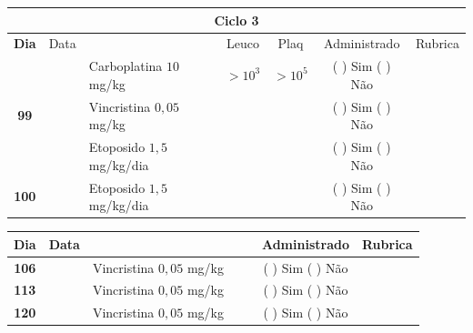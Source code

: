 \documentclass[11pt,a4paper,oldfontcommands]{memoir}
\begin{document}
\begin{center}
\begin{longtable}{p{1cm}c|p{5cm}|p{1.5cm}p{1.5cm}|c|c}
	\hline
	\multicolumn{7}{c}{Ciclo 3} \\
	\hline
	\multicolumn{1}{c|}{\multirow{1}{*}{\textbf{Dia}}}&{Data}&{}&\multicolumn{1}{c|}{Leuco}&\multicolumn{1}{c|}{Plaq}&{Administrado}&{Rubrica} \\
    \hline
    \multicolumn{1}{c|}{\multirow{3}{*}{\textbf{99}}}&\multirow{2}{*}{}&{Carboplatina \(10\) mg/kg}&\multicolumn{1}{c|}{\(>10^3\)}&\multicolumn{1}{c|}{\(>10^5\)}&{(  ) Sim (  ) Não}&\\
    \cline{4-5}
    \multicolumn{1}{c|}{}&&{Vincristina \(0,05\) mg/kg}&\multicolumn{1}{c|}{}&&{(  ) Sim (  ) Não}&\\
    \cline{4-5}
    \multicolumn{1}{c|}{}&\multirow{1}{*}{}&{Etoposido \(1,5\) mg/kg/dia}&{}&&{(  ) Sim (  ) Não}&\\
    \cline{1-3}\cline{6-6}
    \multicolumn{1}{c|}{\textbf{100}}&\multirow{1}{*}{}&{Etoposido \(1,5\) mg/kg/dia}&{}&&{(  ) Sim (  ) Não}&\\
    \hline
\end{longtable}
\begin{longtable}{p{1cm}c|p{4cm}|p{2cm}p{2cm}|c|c}
	\hline
	\multicolumn{1}{c|}{\multirow{1}{*}{\textbf{Dia}}}&{Data}&{}&{}&&{Administrado}&{Rubrica} \\
    \hline
    \multicolumn{1}{c|}{\textbf{106}}&&{Vincristina \(0,05\) mg/kg}&\multicolumn{1}{c}{}&&{(  ) Sim (  ) Não}&\\
    \hline
    \multicolumn{1}{c|}{\textbf{113}}&&{Vincristina \(0,05\) mg/kg}&\multicolumn{1}{c}{}&&{(  ) Sim (  ) Não}&\\
    \hline
    \multicolumn{1}{c|}{\textbf{120}}&&{Vincristina \(0,05\) mg/kg}&\multicolumn{1}{c}{}&&{(  ) Sim (  ) Não}&\\
    \hline
\end{longtable}


\end{center}
\end{document}

